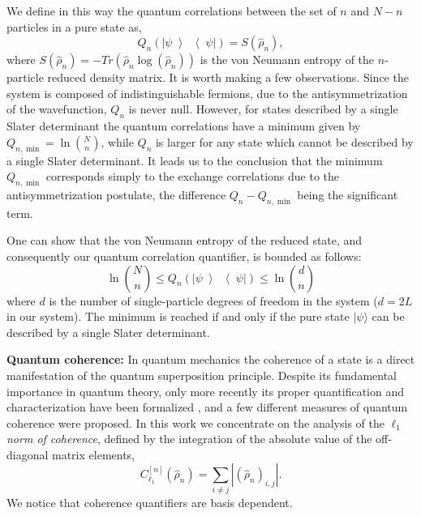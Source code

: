 \documentclass[prb,reprint,showpacs,twocolumn,superscriptaddress]{revtex4-2}
\newcommand{\ketbra}[2]{\left|#1\middle\rangle\middle\langle#2\right|}
\begin{document}
We define in this way the quantum correlations between the set of $n$ and $N-n$ particles 
in a pure state as,
\begin{equation}
 Q_n \left (\ketbra{\psi}{\psi} \right) = 
 S(\hat \rho_n),
\end{equation}
where $S(\hat \rho_n ) = - Tr(\hat \rho_n \log(\hat \rho_n))$ is the von Neumann entropy 
of the $n$-particle reduced density matrix. It is worth making a few observations.
Since the system is composed of indistinguishable fermions, 
due to the antisymmetrization of the wavefunction, $Q_n$ is never null. 
However, for states described by a single Slater determinant the quantum correlations have 
a minimum given by $Q_{n,\min} =  \ln  \binom{N}{n}$, 
while $Q_n $ is larger for any state which cannot be described by a single Slater determinant. 
It leads us to the conclusion that the minimum $Q_{n,\min}$ corresponds simply to the 
exchange correlations due to the antisymmetrization postulate, 
the difference $Q_n - Q_{n,\min}$ being the significant term.
 
One can show \cite{plastino2009,plastino2016} that the von Neumann entropy of the reduced state, 
and consequently our quantum correlation quantifier, is bounded as follows:
\begin{equation}
 \ln  \binom{N}{n} \leq Q_n \left (\ketbra{\psi}{\psi} \right) \leq \ln \binom{d}{n}
\end{equation}
where $d$ is the number of single-particle degrees of freedom in the system ($d=2L$ in our system). 
The minimum is reached if and only if the pure state $|\psi\rangle$ can be described by a single Slater determinant.
 
\textbf{Quantum coherence:} In quantum mechanics the coherence of a state is a direct 
manifestation of the quantum superposition principle. 
Despite its fundamental importance in quantum theory, 
only more recently its proper quantification and characterization have been formalized 
\cite{Baumgratz2014}, and a few different measures of quantum coherence were proposed. 
In this work we concentrate on the analysis of the \textit{$\ell_1$ norm of coherence}, 
defined by the integration of the absolute value of the off-diagonal matrix elements,
\begin{equation}
 C_{\ell_1}^{[n]}(\hat \rho_n) =  \sum_{i \neq j} |(\hat \rho_n)_{i,j}|.
\end{equation}
We notice that coherence quantifiers are basis dependent.
\end{document}
